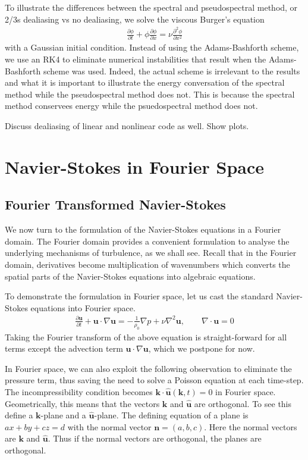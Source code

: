 To illustrate the differences between the spectral and pseudospectral method, or 2/3s dealiasing vs no dealiasing, we solve the viscous Burger's equation
\begin{align}
\frac{\partial \phi}{\partial t} + \phi\frac{\partial \phi}{\partial x} = \nu \frac{\partial^{2}\phi}{\partial x^{2}}
\end{align}
with a Gaussian initial condition. Instead of using the Adams-Bashforth scheme, we use an RK4 to eliminate numerical instabilities that result when the Adams-Bashforth scheme was used. Indeed, the actual scheme is irrelevant to the results and what it is important to illustrate the energy conversation of the spectral method while the pseudospectral method does not. This is because the spectral method conservees energy while the psuedospectral method does not. 


Discuss dealiasing of linear and nonlinear code as well. Show plots. 
\section{Navier-Stokes in Fourier Space}
\subsection{Fourier Transformed Navier-Stokes}
We now turn to the formulation of the Navier-Stokes equations in a Fourier domain. The Fourier domain provides a convenient formulation to analyse the underlying mechanisms of turbulence, as we shall see. Recall that in the Fourier domain, derivatives become multiplication of wavenumbers which converts the spatial parts of the Navier-Stokes equations into algebraic equations. 

To demonstrate the formulation in Fourier space, let us cast the standard Navier-Stokes equations into Fourier space. 
\begin{align}
\frac{\partial \textbf{u}}{\partial t} + \textbf{u}\cdot\nabla\textbf{u} = -\frac{1}{\rho_{0}}\nabla p + \nu\nabla^{2}\textbf{u}, \qquad \nabla\cdot\textbf{u}=0
\end{align}
Taking the Fourier transform of the above equation is straight-forward for all terms except the advection term $\textbf{u}\cdot\nabla\textbf{u}$, which we postpone for now.

In Fourier space, we can also exploit the following observation to eliminate the pressure term, thus saving the need to solve a Poisson equation at each time-step. The incompressibility condition becomes $\textbf{k}\cdot\hat{\textbf{u}}(\textbf{k},t)=0$ in Fourier space. Geometrically, this means that the vectors $\textbf{k}$ and $\hat{\textbf{u}}$ are orthogonal. To see this define a $\textbf{k}$-plane and a $\hat{\textbf{u}}$-plane. The defining equation of a plane is $ax+by+cz=d$ with the normal vector $\textbf{n}=(a,b,c)$. Here the normal vectors are $\textbf{k}$ and $\hat{\textbf{u}}$. Thus if the normal vectors are orthogonal, the planes are orthogonal.

